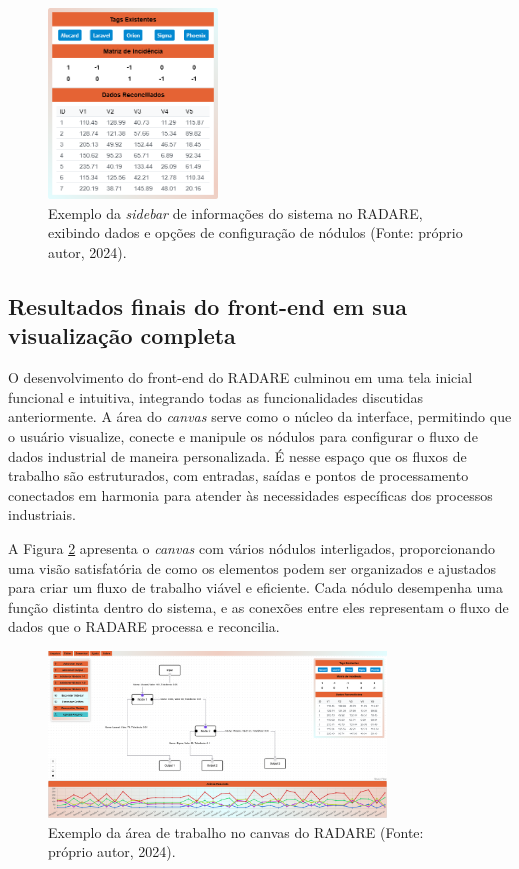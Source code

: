 \begin{figure}[htbp]
    \centering
    \includegraphics[width=0.4\textwidth]{figuras/interface-sidebar.png}
    \caption{Exemplo da \textit{sidebar} de informações do sistema no RADARE, exibindo dados e opções de configuração de nódulos (Fonte: próprio autor, 2024).}
    \label{Fig:SidebarInterface}
\end{figure}

\subsection{Resultados finais do front-end em sua visualização completa}

O desenvolvimento do front-end do RADARE culminou em uma tela inicial funcional e intuitiva, integrando todas as funcionalidades discutidas anteriormente. A área do \textit{canvas} serve como o núcleo da interface, permitindo que o usuário visualize, conecte e manipule os nódulos para configurar o fluxo de dados industrial de maneira personalizada. É nesse espaço que os fluxos de trabalho são estruturados, com entradas, saídas e pontos de processamento conectados em harmonia para atender às necessidades específicas dos processos industriais.

A Figura \ref{Fig:CanvasArea} apresenta o \textit{canvas} com vários nódulos interligados, proporcionando uma visão satisfatória de como os elementos podem ser organizados e ajustados para criar um fluxo de trabalho viável e eficiente. Cada nódulo desempenha uma função distinta dentro do sistema, e as conexões entre eles representam o fluxo de dados que o RADARE processa e reconcilia. 

\begin{figure}[htbp]
    \centering
    \includegraphics[width=0.8\textwidth]{figuras/interface-completa.png}
    \caption{Exemplo da área de trabalho no canvas do RADARE (Fonte: próprio autor, 2024).}
    \label{Fig:CanvasArea}
\end{figure}

